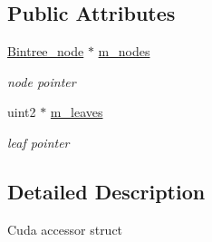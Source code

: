 \subsection*{\-Public \-Attributes}
\begin{DoxyCompactItemize}
\item 
\hypertarget{structnih_1_1cuda_1_1_bintree__context_1_1_context_ad59c599bf1548b01dc09f8e4a25d3f7f}{
\hyperlink{structnih_1_1_bintree__node}{\-Bintree\-\_\-node} $\ast$ \hyperlink{structnih_1_1cuda_1_1_bintree__context_1_1_context_ad59c599bf1548b01dc09f8e4a25d3f7f}{m\-\_\-nodes}}
\label{structnih_1_1cuda_1_1_bintree__context_1_1_context_ad59c599bf1548b01dc09f8e4a25d3f7f}

\begin{DoxyCompactList}\small\item\em node pointer \end{DoxyCompactList}\item 
\hypertarget{structnih_1_1cuda_1_1_bintree__context_1_1_context_ae16d11862369cf46f24b11078febc1e3}{
uint2 $\ast$ \hyperlink{structnih_1_1cuda_1_1_bintree__context_1_1_context_ae16d11862369cf46f24b11078febc1e3}{m\-\_\-leaves}}
\label{structnih_1_1cuda_1_1_bintree__context_1_1_context_ae16d11862369cf46f24b11078febc1e3}

\begin{DoxyCompactList}\small\item\em leaf pointer \end{DoxyCompactList}\end{DoxyCompactItemize}


\subsection{\-Detailed \-Description}
\-Cuda accessor struct 

